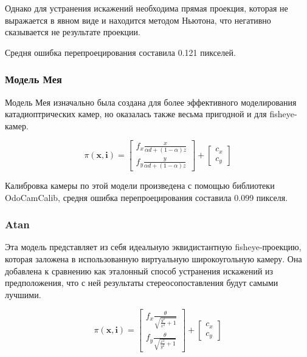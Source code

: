 Однако для устранения искажений необходима прямая проекция, которая не выражается в явном виде  и находится методом 
Ньютона, что негативно сказывается не результате проекции. 

Средня ошибка перепроецирования составила 0.121 пикселей. %

\subsubsection{Модель Мея}

Модель Мея \cite{mei} изначально была создана для более эффективного моделирования катадиоптрических камер, но оказалась также весьма
пригодной и для fisheye-камер. 

\begin{equation}
\pi(\mathbf{x}, \mathbf{i})=\left[\begin{array}{l}
	f_{x} \frac{x}{\alpha d+(1-\alpha) z} \\
	f_{y} \frac{y}{\alpha d+(1-\alpha) z}
	\end{array}\right]+\left[\begin{array}{l}
	c_{x} \\
	c_{y}
	\end{array}\right]
\end{equation}

Калибровка камеры по этой модели произведена с помощью библиотеки OdoCamCalib, средня ошибка перепроецирования 
составила 0.099 пикселя.

\subsubsection{Atan}

Эта модель представляет из себя идеальную эквидистантную fisheye-проекцию, которая заложена в использованную виртуальную широкоугольную камеру. 
Она добавлена к сравнению как эталонный способ устранения искажений из предположения, что с ней результаты стереосопоставления будут 
самыми лучшими.  

\begin{equation}
	\pi(\mathbf{x}, \mathbf{i})=\left[\begin{array}{l}
		f_{x} \frac{\theta}{ \sqrt{ \frac{y^2}{x^2} + 1 }} \\
		f_{y} \frac{\theta}{ \sqrt{ \frac{x^2}{y^2} + 1 }}
		\end{array}\right]+\left[\begin{array}{l}
		c_{x} \\
		c_{y}
		\end{array}\right]
	\end{equation}

